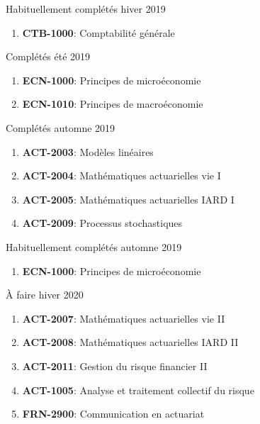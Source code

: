\documentclass[10pt, french]{article}
\begin{document}
\begin{multicols*}{2}
\begin{algo2}{Habituellement complétés hiver 2019}
\begin{enumerate}
	\item[] \textbf{CTB-1000}: Comptabilité générale
\end{enumerate}
\end{algo2}

\begin{algo2}{Complétés été 2019}
\begin{enumerate}
	\item[] \textbf{ECN-1000}: Principes de microéconomie
	\item[] \textbf{ECN-1010}: Principes de macroéconomie
\end{enumerate}
\end{algo2}



\begin{algo}{Complétés automne 2019}
\begin{enumerate}
	\item[] \textbf{ACT-2003}: Modèles linéaires                                 
	\item[] \textbf{ACT-2004}: Mathématiques actuarielles vie I       
	\item[] \textbf{ACT-2005}: Mathématiques actuarielles IARD I     
	\item[] \textbf{ACT-2009}: Processus stochastiques                           
\end{enumerate}
\end{algo}

\begin{algo2}{Habituellement complétés automne 2019}
\begin{enumerate}
	\item[] \textbf{ECN-1000}: Principes de microéconomie            
\end{enumerate}
\end{algo2}

\begin{algo3}{À faire hiver 2020}
\begin{enumerate}
	\item[] \textbf{ACT-2007}: Mathématiques actuarielles vie II         
	\item[] \textbf{ACT-2008}: Mathématiques actuarielles IARD II        
	\item[] \textbf{ACT-2011}: Gestion du risque financier II                     
	\item[] \textcolor{green!60!black}{\textbf{ACT-1005}: Analyse et traitement collectif du risque} 
	\item[] \textcolor{green!60!black}{\textbf{FRN-2900}: Communication en actuariat}
\end{enumerate}
\end{algo3}


\end{multicols*}
\end{document}

